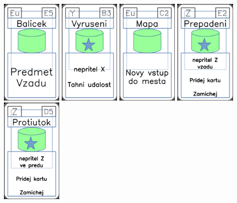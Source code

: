 \documentclass[a4paper]{article}
\begin{document}
	\includegraphics[width=3.0cm]{img-4_24}
	\includegraphics[width=3.0cm]{img-5_37}
	\includegraphics[width=3.0cm]{img-4_41}
	\includegraphics[width=3.0cm]{img-5_51}
	\includegraphics[width=3.0cm]{img-5_49}
\end{document}
